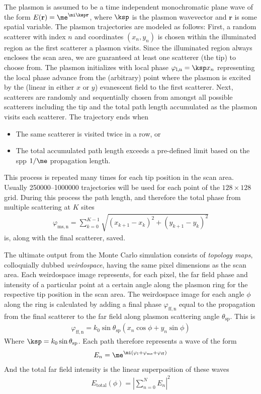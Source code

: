 The plasmon is assumed to be a time independent monochromatic plane wave
of the form $E(\mathbf{r})=\me^{\mi \ksp\mathbf{r}}$, where
$\ksp$ is the plasmon wavevector and $\mathbf{r}$ is some
spatial variable.  The plasmon trajectories are modeled as follows:
First, a random scatterer with index $n$ and coordinates $(x_n,y_n)$ is
chosen within the illuminated region as the first scatterer a plasmon
visits.  Since the illuminated region always encloses the scan area, we are
guaranteed at least one scatterer (the tip) to choose from.  The plasmon
initializes with local phase $\varphi_\mathrm{l,n}=\ksp x_n$
representing the local phase advance from the (arbitrary) point where the
plasmon is excited by the (linear in either $x$ or $y$) evanescent field to
the first scatterer.  Next, scatterers are randomly and sequentially chosen
from amongst all possible scatterers including the tip and the total path
length accumulated as the plasmon visits each scatterer.  The trajectory
ends when
\begin{itemize}
\item The same scatterer is visited twice in a row, or
\item The total accumulated path length exceeds a pre-defined limit based
				on the \gls{spp} $1/\me$ propagation length.
\end{itemize}
This process is repeated many times for each tip position in the scan area.
Usually \numrange{250000}{1000000} trajectories will be used for each point
of the $128\times128$ grid.  During this process the path length, and
therefore the total phase from multiple scattering at $K$ sites
\begin{align}
				\varphi_\mathrm{ms,n}=\sum_{k=0}^{K-1}\sqrt{{(x_{k+1}-x_k)}^2+{(y_{k+1}-y_k)}^2}
\end{align}
is, along with the final scatterer, saved.

The ultimate output from the Monte Carlo simulation consists of {\it
topology maps}, colloquially dubbed \textit{weirdospace}, having the same pixel
dimensions as the scan area.  Each weirdospace image represents, for each
pixel, the far field phase and intensity of a particular point at a certain
angle along the plasmon ring for the respective tip position in the scan
area.  The weirdospace image for each angle $\phi$ along the ring is
calculated by adding a final phase $\varphi_\mathrm{ff,n}$ equal to the
propagation from the final scatterer to the far field along plasmon
scattering angle $\theta_\mathrm{sp}$.  This is
\begin{align}
\varphi_\mathrm{ff,n} = k_0 \sin
\theta_\mathrm{sp}\left(x_n\cos\phi+y_n\sin\phi\right)
\end{align}
Where $\ksp=k_0\sin \theta_\mathrm{sp}$.  Each path therefore
represents a wave of the form
\begin{align}
E_n=\me^{\mi(\varphi_\mathrm{l}+\varphi_\mathrm{ms}+\varphi_\mathrm{ff})}
\end{align}
And the total far field intensity is the linear superposition of these
waves
\begin{align}
E_\mathrm{total}(\phi) =
\left|\sum_{n=0}^{N} E_n\right|^2
\end{align}

